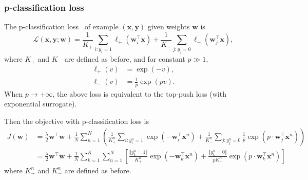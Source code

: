 \documentclass[9pt]{extarticle}
\newcommand{\llb}{\llbracket}
\newcommand{\rrb}{\rrbracket}
\newcommand{\x}{\mathbf{x}}
\newcommand{\y}{\mathbf{y}}
\newcommand{\1}{\mathbf{1}}
\newcommand{\w}{\mathbf{w}}
\newcommand{\LCal}{\mathcal{L}}
\newcommand{\pb}[1]{^{({#1})}}
\begin{document}
\subsubsection{p-classification loss}
\label{sssec:pclass}

The p-classification loss~\cite{ertekin2011equivalence} of example $(\x, \y)$ given weights $\w$ is
\begin{equation}
\label{eq:loss_pclass}
\LCal(\x, \y; \w) = \frac{1}{K_+} \sum_{i:y_i=1} \ell_+(\w_i^\top \x) + \frac{1}{K_-} \sum_{j:y_j=0} \ell_-(\w_j^\top \x),
\end{equation}
where $K_+$ and $K_-$ are defined as before, 
and for constant $p \gg 1$,
\begin{equation}
\begin{aligned}
\ell_+(v) & = \exp(-v), \\
\ell_-(v) & = \frac{1}{p} \exp(pv).
\end{aligned}
\end{equation}
When $p \to +\infty$, the above loss is equivalent to the top-push loss (with exponential surrogate).

Then the objective with p-classification loss is
\begin{align*}
J(\w) 
&= \frac{\lambda}{2} \w^\top \w + \frac{1}{N} \sum_{n=1}^N \left( 
   \frac{1}{K_+^n} \sum_{i:y_i^n=1} \exp(-\w_i^\top \x^n) + 
   \frac{1}{K_-^n} \sum_{j:y_j^n=0} \frac{1}{p} \exp(p \cdot \w_j^\top \x^n) \right) \\
&= \frac{\lambda}{2} \w^\top \w + \frac{1}{N} \sum_{k=1}^K \sum_{n=1}^N \left[
   \frac{\llb y_k^n = 1 \rrb}{K_+^n} \exp(-\w_k^\top \x^n) + 
   \frac{\llb y_k^n = 0 \rrb}{p K_-^n} \exp(p \cdot \w_k^\top \x^n) \right]
\end{align*}
where $K_+^n$ and $K_-^n$ are defined as before.


\end{document}
